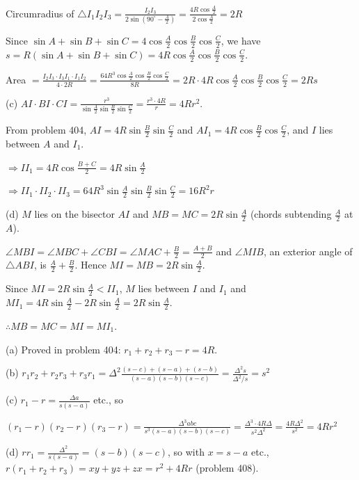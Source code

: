   Circumradius of $\triangle I_1I_2I_3 = \frac{I_2I_3}{2\sin\left(90^\circ - \frac{A}{2}\right)} =
  \frac{4R\cos\frac{A}{2}}{2\cos\frac{A}{2}} = 2R$

  Since $\sin A + \sin B + \sin C = 4\cos\frac{A}{2}\cos\frac{B}{2}\cos\frac{C}{2}$, we have $s = R(\sin A +
  \sin B + \sin C) = 4R\cos\frac{A}{2}\cos\frac{B}{2}\cos\frac{C}{2}$.

  Area $= \frac{I_2I_3\cdot I_3I_1\cdot I_1I_2}{4\cdot2R} = \frac{64R^3\cos\frac{A}{2}\cos\frac{B}{2}
  \cos\frac{C}{2}}{8R} = 2R\cdot4R\cos\frac{A}{2}\cos\frac{B}{2}\cos\frac{C}{2} = 2Rs$

  (c) $AI\cdot BI\cdot CI = \frac{r^3}{\sin\frac{A}{2}\sin\frac{B}{2}\sin\frac{C}{2}} =
  \frac{r^3\cdot4R}{r} = 4Rr^2$.

  From problem 404, $AI = 4R\sin\frac{B}{2}\sin\frac{C}{2}$ and $AI_1 = 4R\cos\frac{B}{2}\cos\frac{C}{2}$, and
  $I$ lies between $A$ and $I_1$.

  $\Rightarrow II_1 = 4R\cos\frac{B + C}{2} = 4R\sin\frac{A}{2}$

  $\Rightarrow II_1\cdot II_2\cdot II_3 = 64R^3\sin\frac{A}{2}\sin\frac{B}{2}\sin\frac{C}{2} = 16R^2r$

  (d) $M$ lies on the bisector $AI$ and $MB = MC = 2R\sin\frac{A}{2}$ (chords subtending $\frac{A}{2}$ at $A$).

  $\angle MBI = \angle MBC + \angle CBI = \angle MAC + \frac{B}{2} = \frac{A + B}{2}$ and $\angle MIB$, an
  exterior angle of $\triangle ABI$, is $\frac{A}{2} + \frac{B}{2}$. Hence $MI = MB = 2R\sin\frac{A}{2}$.

  Since $MI = 2R\sin\frac{A}{2} < II_1$, $M$ lies between $I$ and $I_1$ and $MI_1 = 4R\sin\frac{A}{2} -
  2R\sin\frac{A}{2} = 2R\sin\frac{A}{2}$.

  $\therefore MB = MC = MI = MI_1$.
\item (a) Proved in problem 404: $r_1 + r_2 + r_3 - r = 4R$.

  (b) $r_1r_2 + r_2r_3 + r_3r_1 = \Delta^2\frac{(s - c) + (s - a) + (s - b)}{(s - a)(s - b)(s - c)} =
  \frac{\Delta^2 s}{\Delta^2/s} = s^2$

  (c) $r_1 - r = \frac{\Delta a}{s(s - a)}$ etc., so

  $(r_1 - r)(r_2 - r)(r_3 - r) = \frac{\Delta^3abc}{s^3(s - a)(s - b)(s - c)} = \frac{\Delta^3\cdot4R\Delta}{s^2
  \Delta^2} = \frac{4R\Delta^2}{s^2} = 4Rr^2$

  (d) $rr_1 = \frac{\Delta^2}{s(s - a)} = (s - b)(s - c)$, so with $x = s - a$ etc., $r(r_1 + r_2 + r_3) = xy +
  yz + zx = r^2 + 4Rr$ (problem 408).

